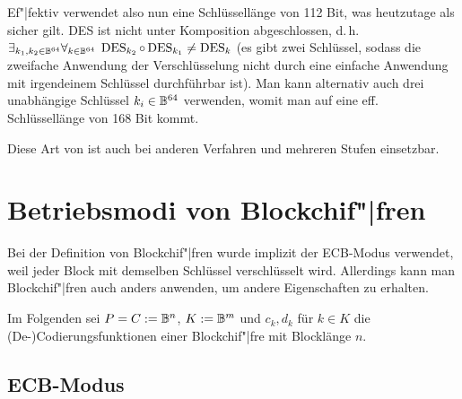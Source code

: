 Ef"|fektiv verwendet also nun eine Schlüssellänge von 112 Bit, was heutzutage als sicher gilt.
DES ist nicht unter Komposition abgeschlossen, d.\,h.
$\exists_{k_1, k_2 \in \mathbb{B}^{64}} \forall_{k \in \mathbb{B}^{64}}\;
\operatorname{DES}_{k_2} \circ \operatorname{DES}_{k_1} \not= \operatorname{DES}_k$
(es gibt zwei Schlüssel, sodass die zweifache Anwendung der Verschlüsselung nicht durch
eine einfache Anwendung mit irgendeinem Schlüssel durchführbar ist).
Man kann alternativ auch drei unabhängige Schlüssel $k_i \in \mathbb{B}^{64}$ verwenden, womit man auf
eine eff. Schlüssellänge von 168 Bit kommt.

Diese Art von  ist auch bei anderen Verfahren und mehreren
Stufen einsetzbar.

\section{%
    Betriebsmodi von Blockchif"|fren%
}

Bei der Definition von Blockchif"|fren wurde implizit der ECB-Modus verwendet,
weil jeder Block mit demselben Schlüssel verschlüsselt wird.
Allerdings kann man Blockchif"|fren auch anders anwenden, um andere Eigenschaften zu erhalten.

Im Folgenden sei $P = C := \mathbb{B}^n$, $K := \mathbb{B}^m$ und
$c_k, d_k$ für $k \in K$ die (De-)Codierungsfunktionen einer Blockchif"|fre mit Blocklänge $n$.

\subsection{%
    ECB-Modus%
}

